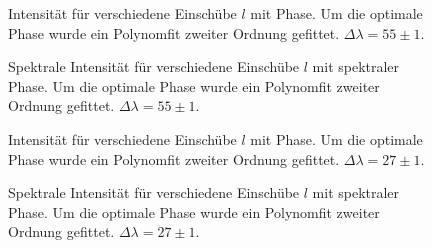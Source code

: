 \documentclass[twoside,        %
               BCOR12mm,       %
               english,ngerman, %
               fleqn,headsepline=false,footsepline=false
              ]{Vorlage/MFPREPORT}
\begin{document}
\begin{figure}[]
    \centering
    
    \caption{Intensität für verschiedene Einschübe $l$ mit Phase. Um die
    optimale Phase wurde ein Polynomfit zweiter Ordnung
    gefittet. $\Delta\lambda=55\pm1$.}
    \label{fig:temp1}
\end{figure}
\begin{figure}[]
    \centering
    
    \caption{Spektrale Intensität für verschiedene Einschübe $l$ mit spektraler Phase. Um die
    optimale Phase wurde ein Polynomfit zweiter Ordnung gefittet. $\Delta\lambda=55\pm1$.}
    \label{fig:spec1}
\end{figure}
\begin{figure}[]
    \centering
    
    \caption{Intensität für verschiedene Einschübe $l$ mit Phase. Um die
    optimale Phase wurde ein Polynomfit zweiter Ordnung gefittet. $\Delta\lambda=27\pm1$.}
    \label{fig:temp2}
\end{figure}
\begin{figure}[]
    \centering
    
    \caption{Spektrale Intensität für verschiedene Einschübe $l$ mit spektraler Phase. Um die
    optimale Phase wurde ein Polynomfit zweiter Ordnung gefittet. $\Delta\lambda=27\pm1$.}
    \label{fig:spec2}
\end{figure}
\end{document}
